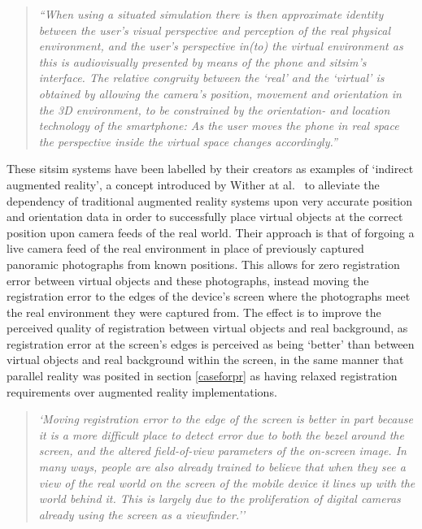 \begin{quote}
	\textit{``When using a situated simulation there is then approximate identity between the user’s visual perspective and perception of the real physical environment, and the user’s perspective in(to) the virtual environment as this is audiovisually presented by means of the phone and sitsim’s interface. The relative congruity between the `real' and the `virtual' is obtained by allowing the camera’s position, movement and orientation in the 3D environment, to be constrained by the orientation- and location technology of the smartphone: As the user moves the phone in real space the perspective inside the virtual space changes accordingly.''}~\cite{Liestøl2011}
\end{quote}

These sitsim systems have been labelled by their creators as examples of `indirect augmented reality', a concept introduced by Wither at al.~\cite{Wither2011} to alleviate the dependency of traditional augmented reality systems upon very accurate position and orientation data in order to successfully place virtual objects at the correct position upon camera feeds of the real world. Their approach is that of forgoing a live camera feed of the real environment in place of previously captured panoramic photographs from known positions. This allows for zero registration error between virtual objects and these photographs, instead moving the registration error to the edges of the device's screen where the photographs meet the real environment they were captured from. The effect is to improve the perceived quality of registration between virtual objects and real background, as registration error at the screen's edges is perceived as being `better' than between virtual objects and real background within the screen, in the same manner that parallel reality was posited in section \ref{caseforpr} as having relaxed registration requirements over augmented reality implementations.

\begin{quote}
	\textit{`Moving registration error to the edge of the screen is better in part because it is a more difficult place to detect error due to both the bezel around the screen, and the altered field-of-view parameters of the on-screen image. In many ways, people are also already trained to believe that when they see a view of the real world on the screen of the mobile device it lines up with the world behind it. This is largely due to the proliferation of digital cameras already using the screen as a viewfinder.''}~\cite{Wither2011}
\end{quote}

